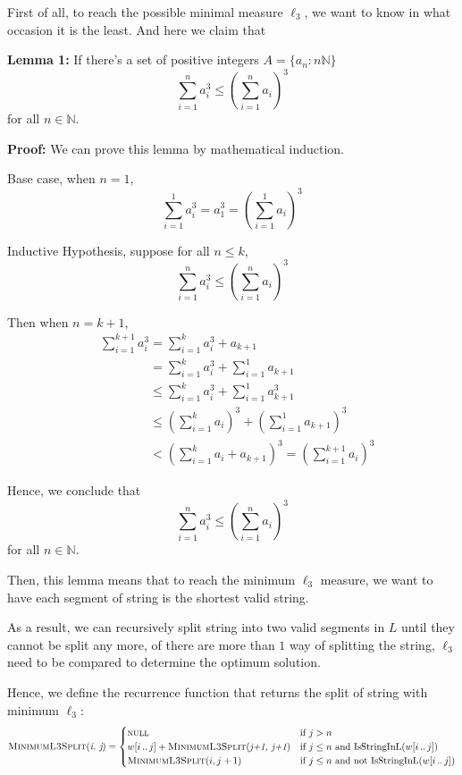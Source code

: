 \documentclass[11pt]{article}
\newcommand{\IsSinL}{\text{IsStringInL}}
\begin{document}
\begin{solution}
	First of all, to reach the possible minimal measure $\ell_3$, we want to know in what occasion it is the least. And here we claim that 
	
	\textbf{Lemma 1:} If there's a set of positive integers $A = \{a_n : n \mathbb{N}\}$
		\[\sum_{i = 1}^n a^3_i \leq (\sum_{i = 1}^n a_i)^3\]
		for all $n \in \mathbb{N}$.
		
	\textbf{Proof:} We can prove this lemma by mathematical induction.
	
	Base case, when $n = 1$, 
		\[\sum_{i = 1}^1 a^3_i = a_1^3 = (\sum_{i = 1}^1 a_i)^3\]
		
	Inductive Hypothesis, suppose for all $n \leq k$,
		\[\sum_{i = 1}^n a^3_i \leq (\sum_{i = 1}^n a_i)^3\]
		
	Then when $n = k + 1$, 
		\begin{align}
			&\sum_{i = 1}^{k + 1} a^3_i = \sum_{i = 1}^k a_i^3 + a_{k + 1}\nonumber\\
			&\phantom{\sum_{i = 1}^{k + 1} a^3_i} = \sum_{i = 1}^k a_i^3 + \sum_{i = 1}^1 a_{k + 1}\nonumber\\
			&\phantom{\sum_{i = 1}^{k + 1} a^3_i} \leq \sum_{i = 1}^k a_i^3 + \sum_{i = 1}^1 a_{k + 1}^3\nonumber\\
			&\phantom{\sum_{i = 1}^{k + 1} a^3_i} \leq (\sum_{i = 1}^{k} a_i)^3 + (\sum_{i = 1}^1 a_{k + 1})^3\nonumber\\
			&\phantom{\sum_{i = 1}^{k + 1} a^3_i} < (\sum_{i = 1}^{k} a_i + a_{k + 1})^3 = (\sum_{i = 1}^{k + 1} a_i)^3\nonumber
		\end{align}
	
	Hence, we conclude that \[\sum_{i = 1}^n a^3_i \leq (\sum_{i = 1}^n a_i)^3\]
		for all $n \in \mathbb{N}$.
		
	Then, this lemma means that to reach the minimum $\ell_3$ measure, we want to have each segment of string is the shortest valid string.
	
	As a result, we can recursively split string into two valid segments in $L$ until they cannot be split any more, of there are more than $1$ way of splitting the string, $\ell_3$ need to be compared to determine the optimum solution.
	
	Hence, we define the recurrence function that returns the split of string with minimum $\ell_3$:
	\[\textsc{MinimumL3Split}(\textit{i, j}) = 
	\begin{cases}
		 \textsc{null} & \text{if $j > n$}\\
		 w[i\, ..\, j] + \textsc{MinimumL3Split}(\textit{j+1, j+1}) & \text{if $j \leq n$ and $\IsSinL(w[i\, ..\, j])$}\\
		 \textsc{MinimumL3Split}(\textit{$i, j + 1$}) & \text{if $j \leq n$ and not $\IsSinL(w[i\, ..\, j])$}
	\end{cases}	\]
	

\end{solution}
\end{document}
